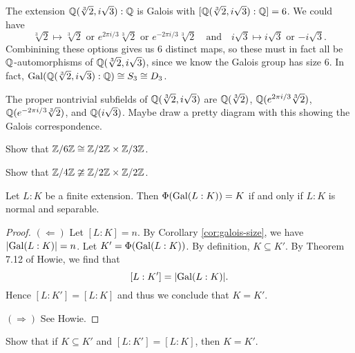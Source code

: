 \begin{example}
  The extension $\mathbb{Q}(\sqrt[3]{2}, i\sqrt{3}) : \mathbb{Q}$ is
  Galois with $[\mathbb{Q}(\sqrt[3]{2}, i\sqrt{3}) : \mathbb{Q}] = 6$.
  We could have
  \[
    \sqrt[3]{2} \mapsto \sqrt[3]{2} \text{ or } e^{2\pi i / 3} \sqrt[3]{2} \text{ or } e^{-2\pi i / 3} \sqrt[3]{2}
    \quad \text{and} \quad
    i\sqrt{3} \mapsto i\sqrt{3} \text{ or } {-i\sqrt{3}}.
  \]
  Combinining these options gives us $6$ distinct
  maps, so these must in fact all be
  $\mathbb{Q}$-automorphisms of $\mathbb{Q}(\sqrt[3]{2}, i\sqrt{3})$,
  since we know the Galois group has size $6$.
  In fact, $\operatorname{Gal}(\mathbb{Q}(\sqrt[3]{2}, i\sqrt{3}) : \mathbb{Q}) \cong S_3 \cong D_3$.
\end{example}

\begin{remark}
  The proper nontrivial subfields of
  $\mathbb{Q}(\sqrt[3]{2}, i\sqrt{3})$ are
  $\mathbb{Q}(\sqrt[3]{2})$, $\mathbb{Q}(e^{2\pi i / 3}\sqrt[3]{2})$,
  $\mathbb{Q}(e^{-2\pi i / 3}\sqrt[3]{2})$, and
  $\mathbb{Q}(i\sqrt{3})$. Maybe draw a pretty diagram with this
  showing the Galois correspondence.
\end{remark}

\begin{exercise}
  Show that $\mathbb{Z} / 6\mathbb{Z} \cong \mathbb{Z} / 2\mathbb{Z} \times \mathbb{Z} / 3\mathbb{Z}$.
\end{exercise}

\begin{exercise}
  Show that $\mathbb{Z} / 4\mathbb{Z} \ncong \mathbb{Z} / 2\mathbb{Z} \times \mathbb{Z} / 2\mathbb{Z}$.
\end{exercise}

\begin{theorem}
  Let $L : K$ be a finite extension.
  Then $\Phi(\operatorname{Gal}(L : K)) = K$ if and only if
  $L : K$ is normal and separable.
\end{theorem}

\begin{proof}
  $(\Leftarrow)$ Let $[L : K] = n$. By Corollary
  \ref{cor:galois-size}, we have $|{\operatorname{Gal}(L : K)}| = n$.
  Let $K' = \Phi(\operatorname{Gal}(L : K))$. By definition,
  $K \subseteq K'$. By Theorem 7.12 of Howie, we find that
  \[
    [L : K'] = |{\operatorname{Gal}(L : K)}|.
  \]
  Hence $[L : K'] = [L : K]$ and thus we conclude
  that $K = K'$.

  $(\Rightarrow)$ See Howie.
\end{proof}

\begin{exercise}
  Show that if $K \subseteq K'$ and
  $[L : K'] = [L : K]$, then $K = K'$.
\end{exercise}


